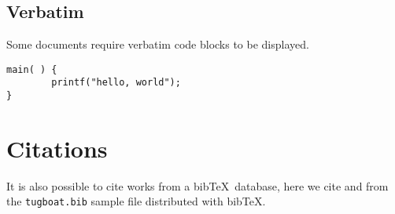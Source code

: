 \documentclass[a4paper,twocolumn]{article}
\begin{document}
\subsection{Verbatim}
Some documents require verbatim code blocks to be displayed.
\begin{verbatim}
main( ) {
        printf("hello, world");
}
\end{verbatim}

\section{Citations}
It is also possible to cite works from a bib\TeX\ database, here we
cite \cite{Knuth:TB5-1-67} and \cite{Hoekwater:TB28-3-312} from the
\texttt{tugboat.bib} sample file distributed with bib\TeX.


\raggedright

\end{document}
